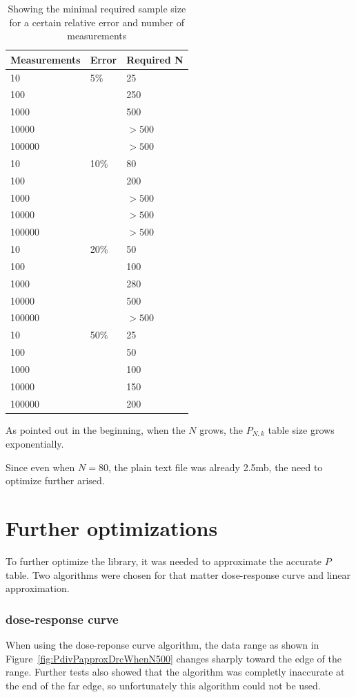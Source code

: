 \documentclass[12pt]{article}
\begin{document}
\begin{table}[!ht]
	\begin{center}
		\caption{Showing the minimal required sample size for a certain relative error and number of measurements}
	    \begin{tabular}{| l | l | l |}
	    \hline
		Measurements & Error & Required N \\
		\hline
		10 & 5\% & 25 \\
		100 & & 250 \\
		1000 & & 500 \\
		10000 & & $>500$ \\
		100000 & & $> 500$ \\
		\hline
		10  & 10\% & 80 \\
		100 & & 200 \\
		1000 & & $>500$ \\
		10000 & & $>500$ \\
		100000  & & $>500$ \\
		\hline
		10  & 20\% & 50 \\
		100 & & 100 \\
		1000  & & 280 \\
		10000  & & 500 \\
		100000  & & $>500$ \\
		\hline
		10  & 50\% &  25 \\
		100 & & 50 \\
		1000 & & 100 \\
		10000 & & 150 \\
		100000 & & 200 \\
		\hline
		\end{tabular}
		\label{table:requiredN}
	\end{center}
\end{table}

As pointed out in the beginning, when the $N$ grows, the $P_{N, k}$ table size grows exponentially.

Since even when $N = 80$, the plain text file was already 2.5mb, the need to optimize further arised.

\section{Further optimizations}

To further optimize the library, it was needed to approximate the accurate $P$ table. Two algorithms were chosen for that matter dose-response curve and linear approximation.

\subsubsection{dose-response curve}
When using the dose-reponse curve algorithm, the data range as shown in Figure~\ref{fig:PdivPapproxDrcWhenN500} changes sharply toward the edge of the range. Further tests also showed that the algorithm was completly inaccurate at the end of the far edge, so unfortunately this algorithm could not be used.
\end{document}
